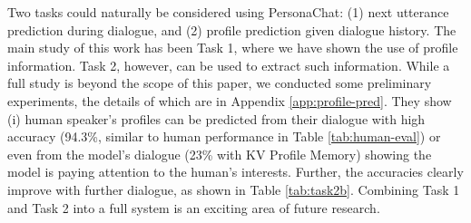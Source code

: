 Two tasks could naturally be considered using {\sc PersonaChat}:
(1) next utterance prediction during dialogue, and (2) profile prediction given dialogue history. 
The main study of this work has been Task 1, where we have shown the use of profile information.
Task 2, however, can be used to extract such information.
While a full study is beyond the scope of this paper, we conducted some preliminary experiments,
the details of which are in Appendix \ref{app:profile-pred}.
They show (i) human speaker's profiles can be predicted from their dialogue with high accuracy
(94.3\%, similar to human performance in Table \ref{tab:human-eval})
 or even from the model's dialogue (23\% with KV Profile Memory) 
showing the model is paying attention to the 
human's interests. Further, the accuracies clearly improve with further dialogue, as shown in Table 
\ref{tab:task2b}. Combining Task 1 and Task 2 into a full system is an exciting area of 
future research.







